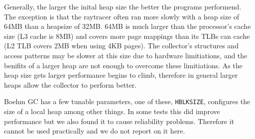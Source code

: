 Generally, the larger the inital heap size the better the programs
performend.
The exception is that the raytracer often ran more slowly with a heap size of 64MB
than a heapsize of 32MB.
64MB is much larger than the processor's cache size (L3 cache is 8MB) and
covers more page mappings than its TLBs can cache (L2 TLB covers 2MB when
using 4KB pages).
The collector's structures and access patterns may be slower at this size
due to hardware limitiations,
and the benifits of a larger heap are not enough to overcome these
limitiations.
As the heap size gets larger performance begins to climb,
therefore in general larger heaps allow the collector to perform better.




Boehm GC has a few tunable parameters, one of these, \texttt{HBLKSIZE},
configures the size of a local heap among other things.
In some tests this did improve performance but we also found it to cause
reliability problems.
Therefore it cannot be used practically and we do not report on it here.

